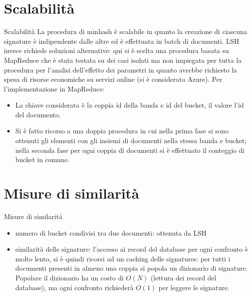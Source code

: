 \documentclass[10pt]{beamer}
\begin{document}
\section{Scalabilità}
\begin{frame}{Scalabilità}
La procedura di minhash è scalabile in quanto la creazione di ciascuna signature è indipendente dalle altre ed è effettuata in batch di documenti. LSH invece richiede soluzioni alternative: qui si è scelta una procedura basata su MapReduce che è stata testata su dei casi isolati ma non impiegata per tutta la procedura per l'analisi dell'effetto dei parametri in quanto avrebbe richiesto la spesa di risorse economiche su servizi online (si è considerato Azure).
Per l'implementazione in MapReduce:
\begin{itemize}
 \item La chiave considerata è la coppia id della banda e id del bucket, il valore l'id del documento.
 \item Si è fatto ricorso a una doppia procedura in cui nella prima fase si sono ottenuti gli elementi con gli insiemi di documenti nella stessa banda e bucket; nella seconda fase per ogni coppia di documenti si è effettuato il conteggio di bucket in comune.
\end{itemize}

\end{frame}


\section{Misure di similarità}
\begin{frame}{Misure di similarità}
\begin{itemize}
	\item numero di bucket condivisi tra due documenti: ottenuta da LSH
	\item similarità delle signature: l’accesso ai record del database per ogni confronto è molto lento, si è quindi ricorsi ad un caching delle signatures: per tutti i documenti presenti in almeno una coppia si popola un dizionario di signature. Popolare il dizionario ha un costo di $O(N)$ (lettura dei record del database), ma ogni confronto richiederà $O(1)$ per leggere le signature.
\end{itemize}
\end{frame}
\end{document}
